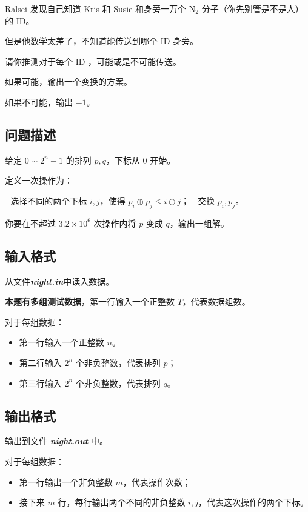 \documentclass[12pt]{article}
\newcommand{\filename}[1]{{\textbf{\textit{#1}}}}
\begin{document}
Ralsei 发现自己知道 Kris 和 Susie 和身旁一万个 $\text{N}_2$ 分子（你先别管是不是人）的 ID。

但是他数学太差了，不知道能传送到哪个 ID 身旁。

请你推测对于每个 ID ，可能或是不可能传送。

如果可能，输出一个变换的方案。

如果不可能，输出 $-1$。

\subsection{问题描述}

给定 $0\sim 2^n-1$ 的排列 $p,q$，下标从 $0$ 开始。

定义一次操作为：

- 选择不同的两个下标 $i,j$，使得 $p_i\oplus p_j\le i\oplus j$；
- 交换 $p_i,p_j$。

你要在不超过 $3.2\times 10^6$ 次操作内将 $p$ 变成 $q$，输出一组解。

\subsection{输入格式}

从文件\filename{night.in}中读入数据。

\textbf{本题有多组测试数据}，第一行输入一个正整数 $T$，代表数据组数。

对于每组数据：

\begin{itemize}
    \item 第一行输入一个正整数 $n$。
    \item 第二行输入 $2^n$ 个非负整数，代表排列 $p$；
    \item 第三行输入 $2^n$ 个非负整数，代表排列 $q$。
\end{itemize}

\subsection{输出格式}

输出到文件 \filename{night.out} 中。

对于每组数据：

\begin{itemize}
  \item 第一行输出一个非负整数 $m$，代表操作次数；
  \item 接下来 $m$ 行，每行输出两个不同的非负整数 $i,j$，代表这次操作的两个下标。
\end{itemize}
\end{document}
